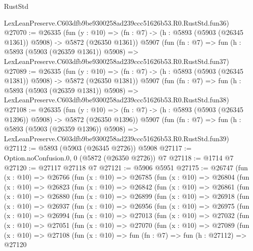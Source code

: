 \begin{lexlean}{RustStd}
\begin{coremodule}
    LexLeanPreserve.C603dfb9be9300258ad239ccc51626b53.R0.RustStd.fun36)
@27070 := @26335
    (fun (y : @10) => (fn : @7) -> (h : @5893 (@5903 (@26345 @1361)) @5908) -> @5872 (@26350 @1361))
    @5907
    (fun (fn : @7) =>
    fun (h : @5893 (@5903 (@26359 @1361)) @5908) =>
    LexLeanPreserve.C603dfb9be9300258ad239ccc51626b53.R0.RustStd.fun37)
@27089 := @26335
    (fun (y : @10) => (fn : @7) -> (h : @5893 (@5903 (@26345 @1381)) @5908) -> @5872 (@26350 @1381))
    @5907
    (fun (fn : @7) =>
    fun (h : @5893 (@5903 (@26359 @1381)) @5908) =>
    LexLeanPreserve.C603dfb9be9300258ad239ccc51626b53.R0.RustStd.fun38)
@27108 := @26335
    (fun (y : @10) => (fn : @7) -> (h : @5893 (@5903 (@26345 @1396)) @5908) -> @5872 (@26350 @1396))
    @5907
    (fun (fn : @7) =>
    fun (h : @5893 (@5903 (@26359 @1396)) @5908) =>
    LexLeanPreserve.C603dfb9be9300258ad239ccc51626b53.R0.RustStd.fun39)
@27112 := @5893 (@5903 (@26345 @2726)) @5908
@27117 := Option.noConfusion.{0, 0} (@5872 (@26350 @2726)) @7
@27118 := @1714 @7
@27120 := @27117 @27118 @7
@27121 := @5906 @5951
@27175 := @26747
    (fun (x : @10) =>
    @26766
      (fun (x : @10) =>
      @26785
        (fun (x : @10) =>
        @26804
          (fun (x : @10) =>
          @26823
            (fun (x : @10) =>
            @26842
              (fun (x : @10) =>
              @26861
                (fun (x : @10) =>
                @26880
                  (fun (x : @10) =>
                  @26899
                    (fun (x : @10) =>
                    @26918
                      (fun (x : @10) =>
                      @26937
                        (fun (x : @10) =>
                        @26956
                          (fun (x : @10) =>
                          @26975
                            (fun (x : @10) =>
                            @26994
                              (fun (x : @10) =>
                              @27013
                                (fun (x : @10) =>
                                @27032
                                  (fun (x : @10) =>
                                  @27051
                                    (fun (x : @10) =>
                                    @27070
                                      (fun (x : @10) =>
                                      @27089
                                        (fun (x : @10) =>
                                        @27108
                                          (fun (x : @10) =>
                                          fun (fn : @7) =>
                                          fun (h : @27112) =>
                                          @27120

\end{coremodule}
\end{lexlean}
